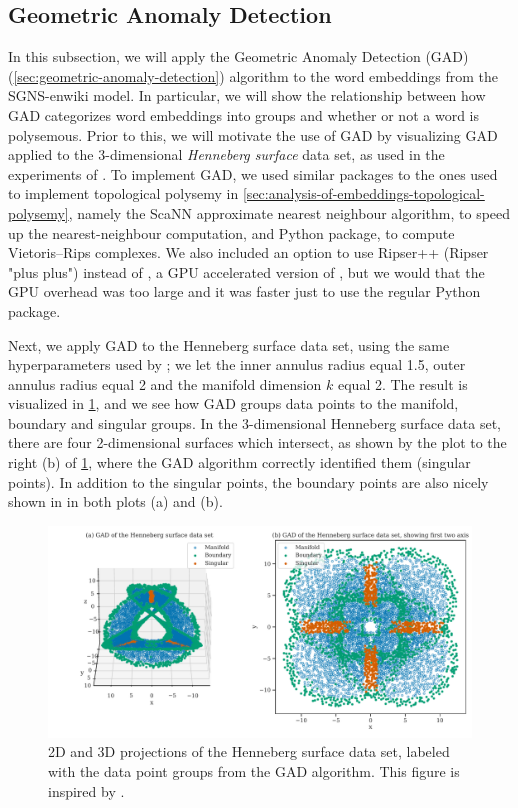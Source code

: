 \subsection{Geometric Anomaly Detection}
\label{sec:analysis-of-embeddings-geometric-anomaly-detection}
In this subsection, we will apply the Geometric Anomaly Detection (GAD) (\cref{sec:geometric-anomaly-detection}) algorithm to the word embeddings from the SGNS-enwiki model. In particular, we will show the relationship between how GAD categorizes word embeddings into groups and whether or not a word is polysemous. Prior to this, we will motivate the use of GAD by visualizing GAD applied to the 3-dimensional \textit{Henneberg surface} data set, as used in the experiments of \cite{stolz2020geometric}. To implement GAD, we used similar packages to the ones used to implement topological polysemy in \cref{sec:analysis-of-embeddings-topological-polysemy}, namely the ScaNN \cite{scann2020} approximate nearest neighbour algorithm, to speed up the nearest-neighbour computation, and  \cite{ctralie2018ripser} Python package, to compute Vietoris–Rips complexes. We also included an option to use Ripser++ \cite{zhang2020ripserplusplus} (Ripser "plus plus") instead of , a GPU accelerated version of , but we would that the GPU overhead was too large and it was faster just to use the regular  Python package. 

Next, we apply GAD to the Henneberg surface data set, using the same hyperparameters used by \cite{stolz2020geometric}; we let the inner annulus radius equal 1.5, outer annulus radius equal 2 and the manifold dimension $k$ equal 2. The result is visualized in \cref{fig:gad-henneberg-3d}, and we see how GAD groups data points to the manifold, boundary and singular groups. In the 3-dimensional Henneberg surface data set, there are four 2-dimensional surfaces which intersect, as shown by the plot to the right (b) of \cref{fig:gad-henneberg-3d}, where the GAD algorithm correctly identified them (singular points). In addition to the singular points, the boundary points are also nicely shown in in both plots (a) and (b).
\begin{figure}[H]
    \centering
    \includegraphics[width=\textwidth]{thesis/figures/gad-henneberg-3d.pdf}
    \caption{2D and 3D projections of the Henneberg surface data set, labeled with the data point groups from the GAD algorithm. This figure is inspired by \cite[Figure 3]{stolz2020geometric}.}
    \label{fig:gad-henneberg-3d}
\end{figure}

